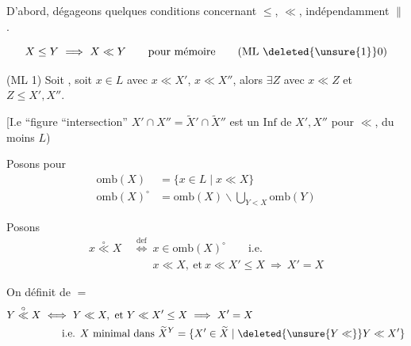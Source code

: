 
D'abord,  dégageons quelques conditions concernant $\leq$, $\ll$,  indépendamment  $\parallel$.

\[
X\leq Y\ \Longrightarrow\ X\ll Y \qquad \text{pour mémoire}
\tag*{(ML \deleted{\unsure{1}}0)}
\]

(ML 1) Soit
, soit $x\in L$ avec $x\ll X'$, $x\ll X''$, alors $\exists Z$ \deleted{\unsure{$\in$}} avec $x\ll Z$ et $Z\leq X',X''$.

[I.e   ``figure ``intersection'' $X'\cap X''=\widetilde X'\cap\widetilde X''$ est un $\mathrm{Inf}$ de $X', X''$ pour $\ll$, du moins  $L$)

 Posons pour 
\[
\begin{aligned}
\mathrm{omb}(X)&=\{x\in L\mid x\ll X\}\\
\mathrm{omb}(X)^\circ&=\mathrm{omb}(X)\smallsetminus\bigcup_{Y<X}\mathrm{omb}(Y)
\end{aligned}
\]

Posons
\[
\begin{aligned}
x\overset{\circ}{\ll}X &\ \overset{\mathrm{def}}{\Longleftrightarrow}\ x\in\mathrm{omb}(X)^\circ \qquad \text{i.e.}\\
&\qquad x\ll X,\ \text{et}\ x\ll X'\leq X\ \Longrightarrow\ X'=X
\end{aligned}
\]

On définit de $=$
\[
\begin{aligned}
Y\overset{\circ}{\ll}X &\ \Longleftrightarrow\ Y\ll X,\ \text{et}\ Y\ll X'\leq X\ \Longrightarrow\ X'=X\\
&\qquad \text{i.e. }X\text{ minimal dans }\widetilde X^{Y}=\{X'\in\widetilde X\mid \deleted{\unsure{Y\ll}}Y\ll X'\}
\end{aligned}
\]

